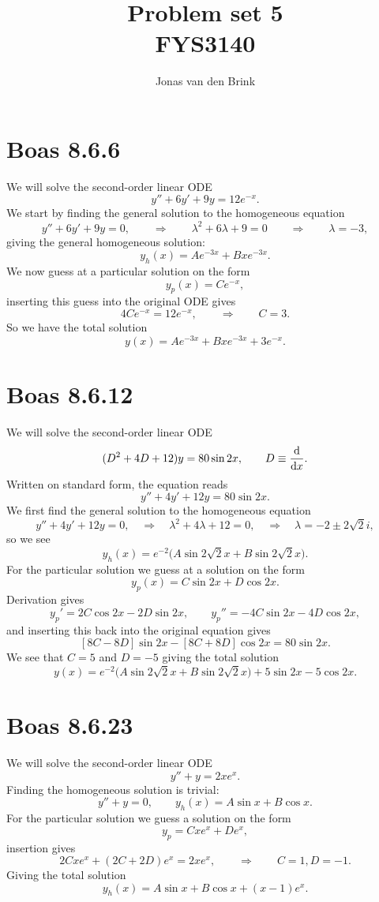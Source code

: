\documentclass[a4paper, 11pt, titlepage, english]{article}
\author{Jonas van den Brink}
\title{Problem set 5 \\ FYS3140}
\renewcommand{\d}{{\rm d}}
\begin{document}
\maketitle
% 

\section*{Boas 8.6.6}
We will solve the second-order linear ODE
$$y'' + 6y' + 9y = 12 e^{-x}.$$
We start by finding the general solution to the homogeneous equation
$$y'' + 6y' + 9y = 0, \qquad \Rightarrow \qquad \lambda^2 + 6\lambda + 9 = 0 \qquad \Rightarrow \qquad \lambda = -3,$$
giving the general homogeneous solution:
$$y_h(x) = Ae^{-3x} + Bxe^{-3x}.$$
We now guess at a particular solution on the form
$$y_p(x) = Ce^{-x},$$
inserting this guess into the original ODE gives
$$4Ce^{-x} = 12e^{-x}, \qquad \Rightarrow \qquad C=3.$$
So we have the total solution
$$y(x) = Ae^{-3x} + Bxe^{-3x} + 3e^{-x}.$$

\section*{Boas 8.6.12}
We will solve the second-order linear ODE
$$(D^2 + 4D + 12)y = 80\sin 2x, \qquad D \equiv \frac{\d}{\d x}.$$
Written on standard form, the equation reads
$$y'' + 4y' + 12y = 80\sin 2x.$$
We first find the general solution to the homogeneous equation
$$y'' + 4y' + 12y = 0, \quad \Rightarrow \quad \lambda^2 + 4\lambda + 12 = 0, \quad \Rightarrow \quad \lambda = -2 \pm 2\sqrt{2}i,$$
so we see
$$y_h(x) = e^{-2}\bigg(A\sin 2\sqrt{2}x + B\sin 2\sqrt{2}x\bigg).$$
For the particular solution we guess at a solution on the form 
$$y_p (x) = C \sin 2x + D\cos 2x.$$
Derivation gives
$$y_p' = 2C\cos 2x - 2D\sin 2x, \qquad y_p'' = -4C\sin 2x - 4D \cos 2x,$$
and inserting this back into the original equation gives
$$[8C - 8D]\sin 2x - [8C + 8D]\cos 2x =  80\sin 2x.$$
We see that $C = 5$ and $D=-5$ giving the total solution
$$y(x) = e^{-2}\bigg(A\sin 2\sqrt{2}x + B\sin 2\sqrt{2}x\bigg) + 5\sin 2x - 5\cos 2x.$$

\section*{Boas 8.6.23}
We will solve the second-order linear ODE
$$y'' + y = 2xe^x.$$
Finding the homogeneous solution is trivial:
$$y'' + y = 0, \qquad y_h(x) = A\sin x + B\cos x.$$
For the particular solution we guess a solution on the form
$$y_p = C x e^x + D e^x,$$
insertion gives
$$2Cxe^x + (2C + 2D)e^x = 2xe^x, \qquad \Rightarrow \qquad C = 1, D= -1.$$
Giving the total solution
$$y_h(x) = A\sin x + B\cos x + (x-1)e^x.$$
\end{document}

